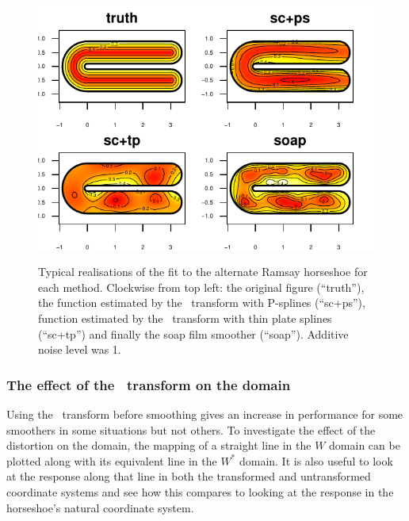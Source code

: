\begin{figure}
\centering
\includegraphics[width=6in]{sc/figs/altramsaycomp.pdf}\\
\caption{Typical realisations of the fit to the alternate Ramsay horseshoe for each method. Clockwise from top left: the original figure (``truth''), the function estimated by the \sch\ transform with P-splines (``sc+ps''), function estimated by the \sch\ transform with thin plate splines (``sc+tp'') and finally the soap film smoother (``soap''). Additive noise level was 1.}
\label{altramsaycomp}
\end{figure}


\subsubsection{The effect of the \sch\ transform on the domain}

Using the \sch\ transform before smoothing gives an increase in performance for some smoothers in some situations but not others. To investigate the effect of the distortion on the domain, the mapping of a straight line in the $W$ domain can be plotted along with its equivalent line in the $W^*$ domain. It is also useful to look at the response along that line in both the transformed and untransformed coordinate systems and see how this compares to looking at the response in the horseshoe's natural coordinate system.

